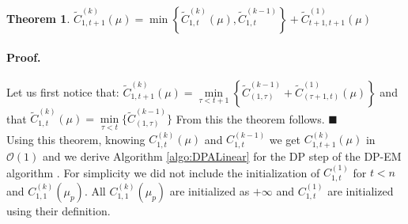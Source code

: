\documentclass[11pt]{llncs}
\newtheorem{theo}{Theorem}[section]    %
\begin{document}

\begin{theo}
$ \widetilde{C}_{1, t+1}^{(k)}(\mu) = \min \left\{ \widetilde{C}_{1, t}^{(k)}(\mu),  \widetilde{C}_{1, t}^{(k-1)} \right\} +  \widetilde{C}_{t+1, t+1}^{(1)}(\mu) $
\end{theo}

\paragraph{Proof. } Let us first notice that: 
$ \widetilde{C}_{1, t+1}^{(k)}(\mu) =  \underset{{\tau < t+1} }{\min}\left\{  \widetilde{C}_{(1,\tau)}^{(k-1)}  +  \widetilde{C}_{(\tau+1, t)}^{(1)}(\mu) \right\}
$
and that $\widetilde{C}_{1, t}^{(k)}(\mu) =\underset{{\tau < t} }{\min}\{  \widetilde{C}_{(1,\tau)}^{(k-1)} \}$
\noindent From this the theorem follows. $\blacksquare$ \\

Using this theorem, knowing $C_{1, t}^{(k)}(\mu)$ and $C_{1, t}^{(k-1)}$ we get $C_{1, t+1}^{(k)}(\mu)$ in $\mathcal{O}(1)$
and we derive Algorithm \ref{algo:DPALinear} for the DP step of the DP-EM algorithm \cite{picard_2007}. For simplicity we did not include the initialization of $C^{(1)}_{1,t}$ for $t < n$ and $C^{(k)}_{1,1}(\mu_p)$.
All $C^{(k)}_{1,1}(\mu_p)$ are initialized as $+\infty$ and $C^{(1)}_{1,t}$ are initialized using their definition.
\end{document}
